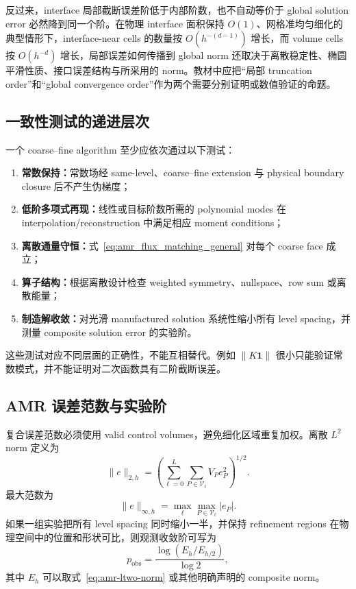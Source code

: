 反过来，interface 局部截断误差阶低于内部阶数，也不自动等价于 global solution error 必然降到同一个阶。在物理 interface 面积保持 $O(1)$、网格准均匀细化的典型情形下，interface-near cells 的数量按 $O(h^{-(d-1)})$ 增长，而 volume cells 按 $O(h^{-d})$ 增长，局部误差如何传播到 global norm 还取决于离散稳定性、椭圆平滑性质、接口误差结构与所采用的 norm。教材中应把“局部 truncation order”和“global convergence order”作为两个需要分别证明或数值验证的命题。

\subsection{一致性测试的递进层次}

一个 coarse--fine algorithm 至少应依次通过以下测试：
\begin{enumerate}
\item \textbf{常数保持：}常数场经 same-level、coarse--fine extension 与 physical boundary closure 后不产生伪梯度；
\item \textbf{低阶多项式再现：}线性或目标阶数所需的 polynomial modes 在 interpolation/reconstruction 中满足相应 moment conditions；
\item \textbf{离散通量守恒：}式~\eqref{eq:amr_flux_matching_general} 对每个 coarse face 成立；
\item \textbf{算子结构：}根据离散设计检查 weighted symmetry、nullspace、row sum 或离散能量；
\item \textbf{制造解收敛：}对光滑 manufactured solution 系统性缩小所有 level spacing，并测量 composite solution error 的实验阶。
\end{enumerate}
这些测试对应不同层面的正确性，不能互相替代。例如 $\|K\bm1\|$ 很小只能验证常数模式，并不能证明对二次函数具有二阶截断误差。

\subsection{AMR 误差范数与实验阶}

复合误差范数必须使用 valid control volumes，避免细化区域重复加权。离散 $L^2$ norm 定义为
\begin{equation}
\boxed{
\|e\|_{2,h}
=
\left(
\sum_{\ell=0}^{L}
\sum_{P\in\mathcal V_\ell}
V_Pe_P^2
\right)^{1/2}.
}
\label{eq:amr-ltwo-norm}
\end{equation}
最大范数为
\begin{equation}
\|e\|_{\infty,h}
=
\max_{\ell}
\max_{P\in\mathcal V_\ell}|e_P|.
\end{equation}
如果一组实验把所有 level spacing 同时缩小一半，并保持 refinement regions 在物理空间中的位置和形状可比，则观测收敛阶可写为
\begin{equation}
p_{\mathrm{obs}}
=
\frac{\log(E_h/E_{h/2})}{\log 2},
\label{eq:amr-observed-order}
\end{equation}
其中 $E_h$ 可以取式~\eqref{eq:amr-ltwo-norm} 或其他明确声明的 composite norm。

